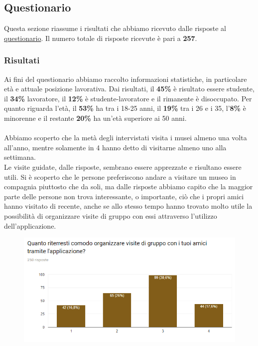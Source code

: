 \def\answers{257}

\subsection{Questionario}

Questa sezione riassume i risultati che abbiamo ricevuto dalle risposte al \href{https://docs.google.com/forms/d/1vKzFGCQb5nvyG6it8HfEqZgZ3ioQ6J1_T6eUiTdYIRc/edit}{questionario}. Il numero totale di risposte ricevute è pari a \textbf{\answers}.

\subsubsection{Risultati}
Ai fini del questionario abbiamo raccolto informazioni statistiche, in particolare età e attuale posizione lavorativa. Dai risultati, il \textbf{45\%} è risultato essere studente, il \textbf{34\%} lavoratore, il \textbf{12\%} è studente-lavoratore e il rimanente è disoccupato. Per quanto riguarda l'età, il \textbf{53\%} ha tra i 18-25 anni, il \textbf{19\%} tra i 26 e i 35, l'\textbf{8\%} è minorenne e il restante \textbf{20\%} ha un'età superiore ai 50 anni.

\paragraph{}
Abbiamo scoperto che la metà degli intervistati visita i musei almeno una volta all'anno, mentre solamente in 4 hanno detto di visitarne almeno uno alla settimana.\\
Le visite guidate, dalle risposte, sembrano essere apprezzate e risultano essere utili. 
Si è scoperto che le persone preferiscono andare a visitare un museo in compagnia piuttosto che da soli, ma dalle risposte abbiamo capito che la maggior parte delle persone non trova interessante, o importante, ciò che i propri amici hanno visitato di recente, anche se allo stesso tempo hanno trovato molto utile la possibilità di organizzare visite di gruppo con essi attraverso l'utilizzo dell'applicazione.

\begin{figure}[ht]
    \centering
    \includegraphics[width=1.0\textwidth]{images/charts-questionario/chart-visite-gruppo.png}
\end{figure}

